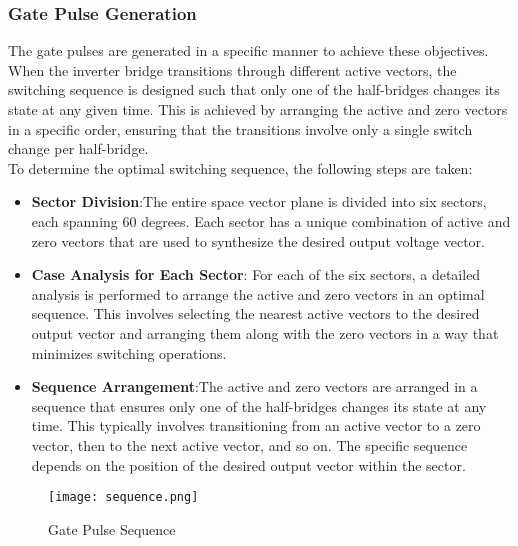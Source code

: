 \subsubsection{Gate Pulse Generation}
The gate pulses are generated in a specific manner to achieve these objectives.
When the inverter bridge transitions through different active vectors, the
switching sequence is designed such that only one of the half-bridges changes
its state at any given time. This is achieved by arranging the active and zero
vectors in a specific order, ensuring that the transitions involve only a
single switch change per half-bridge.\\

To determine the optimal switching sequence, the following steps are taken:

\begin{itemize}
    \item \textbf{Sector Division}:The entire space vector plane is divided into six sectors, each spanning 60 degrees. Each sector has a unique combination of active and zero vectors that are used to synthesize the desired output voltage vector.
    \item\textbf{Case Analysis for Each Sector}: For each of the six sectors, a detailed analysis is performed to arrange the active and zero vectors in an optimal sequence. This involves selecting the nearest active vectors to the desired output vector and arranging them along with the zero vectors in a way that minimizes switching operations.
    \item \textbf{Sequence Arrangement}:The active and zero vectors are arranged in a sequence that ensures only one of the half-bridges changes its state at any time. This typically involves transitioning from an active vector to a zero vector, then to the next active vector, and so on. The specific sequence depends on the position of the desired output vector within the sector.
\end{itemize}

\begin{figure}[ht]
    \centering
    \texttt{[image: sequence.png]}
    \caption{Gate Pulse Sequence}
    \label{fig:gate_pulse_sequence}
\end{figure}